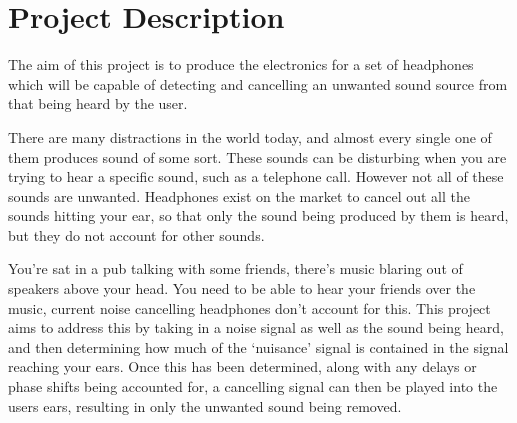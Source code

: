 \section{Project Description}
The aim of this project is to produce the electronics for a set of headphones which will be capable of detecting and cancelling an unwanted sound source from that being heard by the user.

There are many distractions in the world today, and almost every single one of them produces sound of some sort.
These sounds can be disturbing when you are trying to hear a specific sound, such as a telephone call.
However not all of these sounds are unwanted.
Headphones exist on the market to cancel out all the sounds hitting your ear, so that only the sound being produced by them is heard, but they do not account for other sounds.

You're sat in a pub talking with some friends, there's music blaring out of speakers above your head.
You need to be able to hear your friends over the music, current noise cancelling headphones don't account for this.
This project aims to address this by taking in a noise signal as well as the sound being heard, and then determining how much of the `nuisance' signal is contained in the signal reaching your ears.
Once this has been determined, along with any delays or phase shifts being accounted for, a cancelling signal can then be played into the users ears, resulting in only the unwanted sound being removed.
